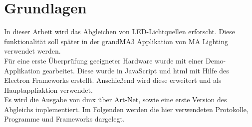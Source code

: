 \documentclass[11pt]{scrartcl}
\begin{document}
\section{Grundlagen}
In dieser Arbeit wird das Abgleichen von LED-Lichtquellen erforscht. Diese funktionalität soll später in der
grandMA3 Applikation von MA Lighting verwendet werden.\\
Für eine erste Überprüfung geeigneter Hardware wurde mit einer Demo-Applikation gearbeitet. Diese wurde
in JavaScript und \ac{html} mit Hilfe des Electron Frameworks erstellt. Anschießend wird diese erweitert und
als Hauptappliaktion verwendet.\\
Es wird die Ausgabe von \ac{dmx} über Art-Net, sowie eine erste Version des Abgleichs implementiert. Im
Folgenden werden die hier verwendeten Protokolle, Programme und Frameworks dargelegt.
\end{document}

